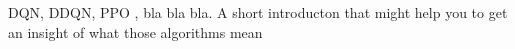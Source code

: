 DQN, DDQN, PPO , bla bla bla. A short introducton that might help you to get an insight of what those algorithms mean
